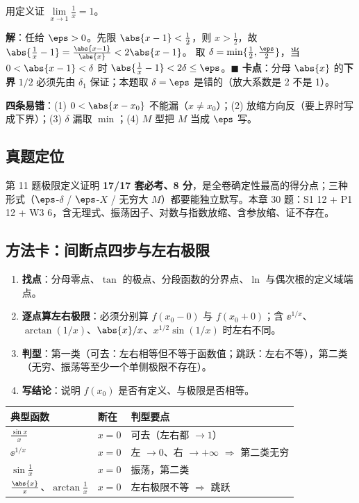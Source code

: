 \begin{keypoint}
用定义证 $\lim\limits_{x\to1}\frac1x=1$。

\noindent\textbf{解}：任给 $\eps>0$。先限 $\abs{x-1}<\frac12$，则 $x>\frac12$，故
$\abs{\frac1x-1}=\frac{\abs{x-1}}{\abs{x}}<2\abs{x-1}$。
取 $\delta=\min\{\frac12,\frac{\eps}{2}\}$，当 $0<\abs{x-1}<\delta$ 时 $\abs{\frac1x-1}<2\delta\le\eps$。$\blacksquare$
\textbf{卡点}：分母 $\abs{x}$ 的\textbf{下界} $1/2$ 必须先由 $\delta_1$ 保证；本题取 $\delta=\eps$ 是错的（放大系数是 2 不是 1）。
\end{keypoint}

\noindent\textbf{四条易错}：(1) $0<\abs{x-x_0}$ 不能漏（$x\neq x_0$）；(2) 放缩方向反（要上界时写成下界）；(3) $\delta$ 漏取 $\min$；(4) $M$ 型把 $M$ 当成 $\eps$ 写。

\subsection{真题定位}
第 11 题极限定义证明 \textbf{17/17 套必考、8 分}，是全卷确定性最高的得分点；三种形式（$\eps$-$\delta$ / $\eps$-$X$ / 无穷大 $M$）都要能独立默写。本章 30 题：S1 12 + P1 12 + W3 6，含无理式、振荡因子、对数与指数放缩、含参放缩、证不存在。

\subsection{方法卡：间断点四步与左右极限}

\begin{enumerate}
\item \textbf{找点}：分母零点、$\tan$ 的极点、分段函数的分界点、$\ln$ 与偶次根的定义域端点。
\item \textbf{逐点算左右极限}：必须分别算 $f(x_0-0)$ 与 $f(x_0+0)$；含 $\ee^{1/x}$、$\arctan(1/x)$、$\abs{x}/x$、$x^{1/2}\sin(1/x)$ 时左右不同。
\item \textbf{判型}：第一类（可去：左右相等但不等于函数值；跳跃：左右不等），第二类（无穷、振荡等至少一个单侧极限不存在）。
\item \textbf{写结论}：说明 $f(x_0)$ 是否有定义、与极限是否相等。
\end{enumerate}

\begin{center}
\begin{tabular}{@{}p{4.2cm}p{5.0cm}p{6.0cm}@{}}
\toprule
\textbf{典型函数} & \textbf{断在} & \textbf{判型要点} \\
\midrule
$\frac{\sin x}{x}$ & $x=0$ & 可去（左右都 $\to1$） \\
$\ee^{1/x}$ & $x=0$ & 左 $\to0$、右 $\to+\infty$ $\Rightarrow$ 第二类无穷 \\
$\sin\frac1x$ & $x=0$ & 振荡，第二类 \\
$\frac{\abs{x}}{x}$、$\arctan\frac1x$ & $x=0$ & 左右极限不等 $\Rightarrow$ 跳跃 \\
\bottomrule
\end{tabular}
\end{center}

